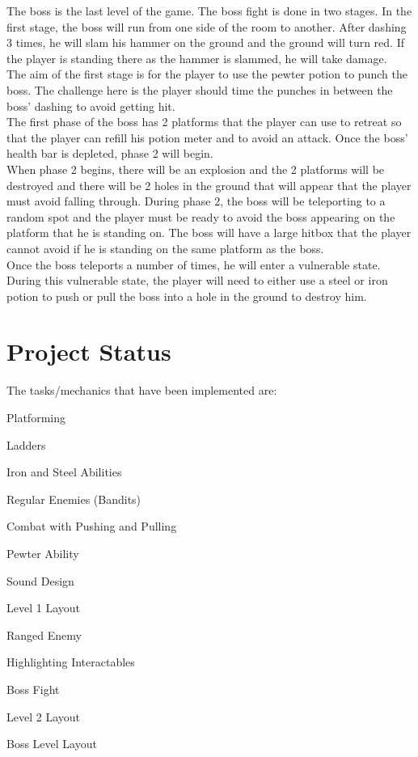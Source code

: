 \documentclass{article}
\begin{document}
The boss is the last level of the game. The boss fight is done in two stages. In the first stage, the boss will run from one side of the room to another. After dashing 3 times,
he will slam his hammer on the ground and the ground will turn red. If the player is standing
there as the hammer is slammed, he will take damage.\\

The aim of the first stage is for the player to use the pewter potion to punch the boss. The
challenge here is the player should time the punches in between the boss’ dashing to avoid
getting hit.\\

The first phase of the boss has 2 platforms that the player can use to retreat so that the player
can refill his potion meter and to avoid an attack. Once the boss’ health bar is depleted, phase 2
will begin.\\

When phase 2 begins, there will be an explosion and the 2 platforms will be destroyed and there
will be 2 holes in the ground that will appear that the player must avoid falling through.
During phase 2, the boss will be teleporting to a random spot and the player must be ready to
avoid the boss appearing on the platform that he is standing on. The boss will have a large
hitbox that the player cannot avoid if he is standing on the same platform as the boss.\\

Once the boss teleports a number of times, he will enter a vulnerable state. During this
vulnerable state, the player will need to either use a steel or iron potion to push or pull the boss
into a hole in the ground to destroy him.


\section{Project Status}
The tasks/mechanics that have been implemented are:
\begin{description}
	\item Platforming
	\item Ladders
	\item Iron and Steel Abilities
	\item Regular Enemies (Bandits)
	\item Combat with Pushing and Pulling
	\item Pewter Ability
	\item Sound Design
	\item Level 1 Layout
	\item Ranged Enemy
	\item Highlighting Interactables
	\item Boss Fight
	\item Level 2 Layout
	\item Boss Level Layout
	\end{description}
\end{document}
